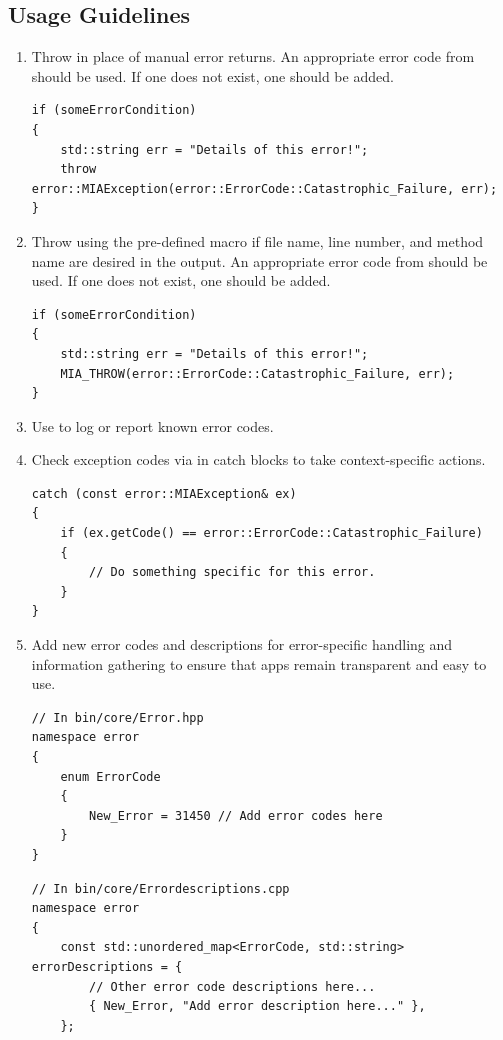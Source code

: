 \subsection{Usage Guidelines}
\begin{enumerate}
	\item Throw  in place of manual error returns. An appropriate error code from  should be used. If one does not exist, one should be added.
	\begin{lstlisting}[style=cppstyle]
if (someErrorCondition) 
{
    std::string err = "Details of this error!";
    throw error::MIAException(error::ErrorCode::Catastrophic_Failure, err); 
}
	\end{lstlisting}
	\item Throw  using the pre-defined macro if file name, line number, and method name are desired in the output. An appropriate error code from  should be used. If one does not exist, one should be added.
	\begin{lstlisting}[style=cppstyle]
if (someErrorCondition) 
{
    std::string err = "Details of this error!";
    MIA_THROW(error::ErrorCode::Catastrophic_Failure, err); 
}
	\end{lstlisting}
	\item Use  to log or report known error codes.
	\item Check exception codes via  in catch blocks to take context-specific actions.
	\begin{lstlisting}[style=cppstyle]
catch (const error::MIAException& ex)
{
    if (ex.getCode() == error::ErrorCode::Catastrophic_Failure)
    {
    	// Do something specific for this error.
    }
}
	\end{lstlisting}
	\item Add new error codes and descriptions for error-specific handling and information gathering to ensure that apps remain transparent and easy to use.
	\begin{lstlisting}[style=cppstyle]
// In bin/core/Error.hpp
namespace error
{
    enum ErrorCode
    {
    	New_Error = 31450 // Add error codes here
    }
}
	\end{lstlisting}
	\begin{lstlisting}[style=cppstyle]
// In bin/core/Errordescriptions.cpp
namespace error
{
    const std::unordered_map<ErrorCode, std::string> errorDescriptions = {
    	// Other error code descriptions here...
        { New_Error, "Add error description here..." },
    };
	\end{lstlisting}
\end{enumerate}


